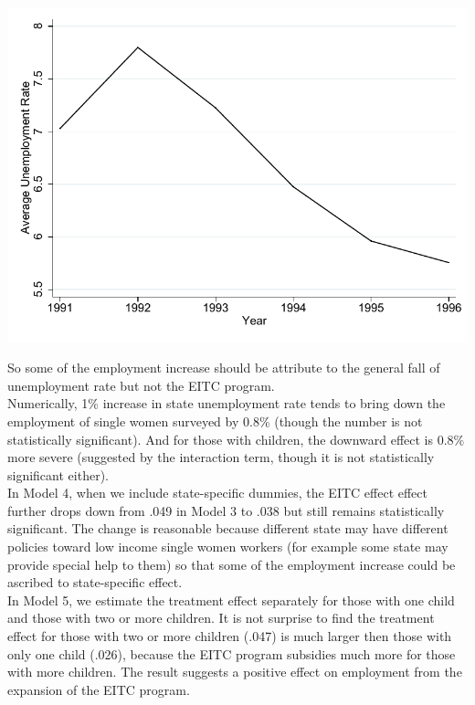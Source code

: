 \documentclass{article}
\begin{document}
\begin{enumerate}
\includegraphics[scale=0.9]{Graph3.pdf}

So some of the employment increase should be attribute to the general fall of unemployment rate but not 
the EITC program. \\

Numerically, 1\% increase in state unemployment rate tends to bring down the employment of single women 
surveyed by 0.8\% (though the number is not statistically significant). And for those with children, 
the downward effect is 0.8\% more severe (suggested by the interaction term, though it is not statistically 
significant either). \\


In Model 4, when we include state-specific dummies, the EITC effect effect further drops down from .049 
in Model 3 to .038 but still remains statistically significant. The change is reasonable because different 
state may have different policies toward low income single women workers (for example some state may provide 
special help to them) so that some of the employment increase could be ascribed to state-specific effect. \\

In Model 5, we estimate the treatment effect separately for those with one child and those with two or more children. 
It is not surprise to find the treatment effect for those with two or more children (.047) is much larger then those 
with only one child (.026), because the EITC program subsidies much more for those with more children. 
The result suggests a positive effect on employment from the expansion of the EITC program. \\


\end{enumerate}
\end{document}
